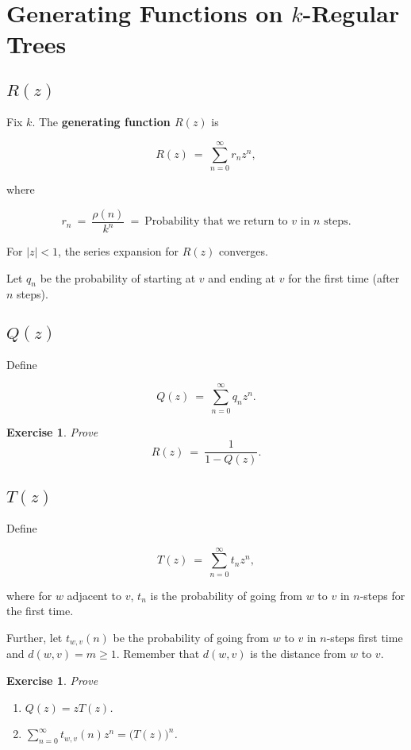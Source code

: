 \documentclass[12pt,letterpaper]{report}
\newcommand\be{\begin{equation}}
\newcommand\ee{\end{equation}}
\newcommand\ben{\begin{enumerate}}
\newcommand\een{\end{enumerate}}
\newcommand{\tbf}[1]{\textbf{#1}}
\newtheorem{exe}[thm]{Exercise}
\begin{document}
\section{Generating Functions on $k$-Regular Trees}

\subsection{$R(z)$}

Fix $k$. The \tbf{generating function $R(z)$} is

\be R(z) \ = \ \sum_{n=0}^\infty r_n z^n, \ee

where

\be r_n \ = \ \frac{\rho(n)}{k^n} \ = \ \text{Probability that we
return to $v$ in $n$ steps}. \ee

For $|z| < 1$, the series expansion for $R(z)$ converges.

Let $q_n$ be the probability of starting at $v$ and ending at $v$
for the first time (after $n$ steps).

\subsection{$Q(z)$}

Define

\be Q(z) \ = \ \sum_{n=0}^\infty q_n z^n. \ee

\begin{exe} Prove
\be R(z) \ = \ \frac{1}{1 - Q(z)}. \ee
\end{exe}

\subsection{$T(z)$}

Define

\be T(z) \ = \ \sum_{n=0}^\infty t_n z^n, \ee

where for $w$ adjacent to $v$, $t_n$ is the probability of going
from $w$ to $v$ in $n$-steps for the first time.

Further, let $t_{w,v}(n)$ be the probability of going from $w$ to
$v$ in $n$-steps first time and $d(w,v) = m \ge 1$. Remember that
$d(w,v)$ is the distance from $w$ to $v$.

\begin{exe} Prove
\ben
\item $Q(z) = zT(z)$.
\item $\sum_{n=0}^\infty t_{w,v}(n) z^n = \Big( T(z) \Big)^n$.
\een
\end{exe}
\end{document}
